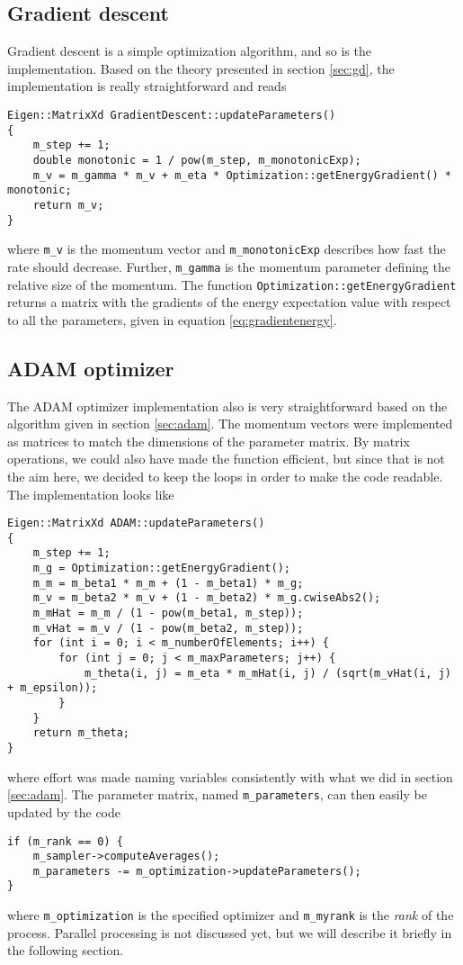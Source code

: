 \subsection{Gradient descent}
Gradient descent is a simple optimization algorithm, and so is the implementation. Based on the theory presented in section \ref{sec:gd}, the implementation is really straightforward and reads
\begin{lstlisting}
Eigen::MatrixXd GradientDescent::updateParameters()
{
	m_step += 1;
	double monotonic = 1 / pow(m_step, m_monotonicExp);
	m_v = m_gamma * m_v + m_eta * Optimization::getEnergyGradient() * monotonic;
	return m_v;
}
\end{lstlisting}
where \lstinline|m_v| is the momentum vector and \lstinline|m_monotonicExp| describes how fast the rate should decrease. Further, \lstinline|m_gamma| is the momentum parameter defining the relative size of the momentum. The function \lstinline|Optimization::getEnergyGradient| returns a matrix with the gradients of the energy expectation value with respect to all the parameters, given in equation \eqref{eq:gradientenergy}.

\subsection{ADAM optimizer}
The ADAM optimizer implementation also is very straightforward based on the algorithm given in section \ref{sec:adam}. The momentum vectors were implemented as matrices to match the dimensions of the parameter matrix. By matrix operations, we could also have made the function efficient, but since that is not the aim here, we decided to keep the loops in order to make the code readable. The implementation looks like
\begin{lstlisting}
Eigen::MatrixXd ADAM::updateParameters()
{
	m_step += 1;
	m_g = Optimization::getEnergyGradient();
	m_m = m_beta1 * m_m + (1 - m_beta1) * m_g;
	m_v = m_beta2 * m_v + (1 - m_beta2) * m_g.cwiseAbs2();
	m_mHat = m_m / (1 - pow(m_beta1, m_step));
	m_vHat = m_v / (1 - pow(m_beta2, m_step));
	for (int i = 0; i < m_numberOfElements; i++) {
		for (int j = 0; j < m_maxParameters; j++) {
			m_theta(i, j) = m_eta * m_mHat(i, j) / (sqrt(m_vHat(i, j) + m_epsilon));
		}
	}
	return m_theta;
}
\end{lstlisting}
where effort was made naming variables consistently with what we did in section \ref{sec:adam}. The parameter matrix, named \lstinline|m_parameters|, can then easily be updated by the code
\begin{lstlisting}
if (m_rank == 0) {
	m_sampler->computeAverages();
	m_parameters -= m_optimization->updateParameters();
}
\end{lstlisting}
where \lstinline|m_optimization| is the specified optimizer and \lstinline|m_myrank| is the \textit{rank} of the process. Parallel processing is not discussed yet, but we will describe it briefly in the following section.


